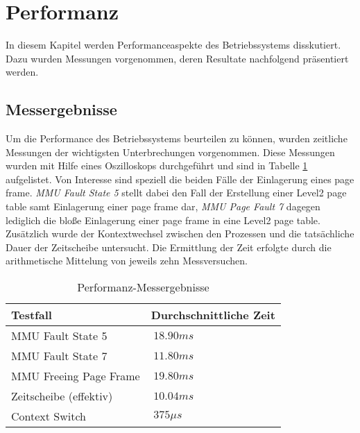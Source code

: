 \section{Performanz}
\label{Performanz}

In diesem Kapitel werden Performanceaspekte des Betriebssystems disskutiert. Dazu wurden Messungen vorgenommen, deren Resultate nachfolgend präsentiert werden.

\subsection{Messergebnisse}
Um die Performance des Betriebssystems beurteilen zu können, wurden zeitliche Messungen der wichtigsten Unterbrechungen vorgenommen. Diese Messungen wurden mit Hilfe eines Oszilloskops durchgeführt und sind in Tabelle \ref{table:osciResults} aufgelistet. Von Interesse sind speziell die beiden Fälle der Einlagerung eines page frame. \emph{MMU Fault State 5} stellt dabei den Fall der Erstellung einer Level2 page table samt Einlagerung einer page frame dar, \emph{MMU Page Fault 7} dagegen lediglich die bloße Einlagerung einer page frame in eine Level2 page table. Zusätzlich wurde der Kontextwechsel zwischen den Prozessen und die tatsächliche Dauer der Zeitscheibe untersucht. Die Ermittlung der Zeit erfolgte durch die arithmetische Mittelung von jeweils zehn Messversuchen.\\

\begin{table}[H]
\begin{tabular}{p{7cm} | p{7cm}}
  \textbf{Testfall} & \textbf{Durchschnittliche Zeit} \\ \hline
  	MMU Fault State 5 & $~18.90 ms$ \\
  	MMU Fault State 7 & $~11.80 ms$ \\
  	MMU Freeing Page Frame & $~19.80 ms$ \\
  	Zeitscheibe (effektiv) & $~10.04 ms$ \\
  	Context Switch & $~375 \mu s$ \\
 \end{tabular}
 \caption{Performanz-Messergebnisse}
 \label{table:osciResults}
\end{table}

\pagebreak 